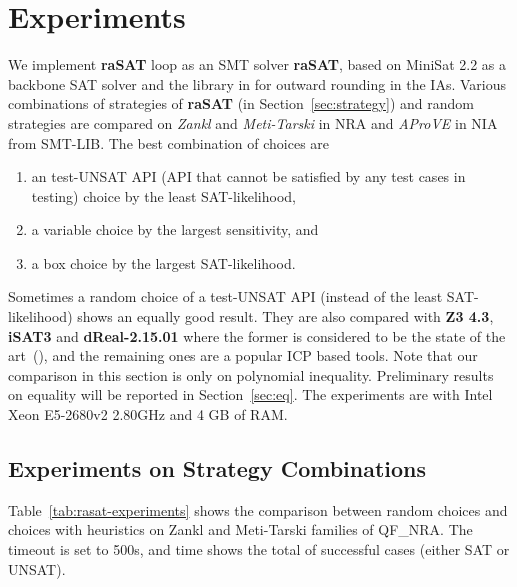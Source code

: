 \documentclass[runningheads,a4paper,oribibl]{llncs}
\begin{document}
\section{Experiments} \label{sec:experiment}

We implement \textbf{raSAT} loop as an SMT solver {\bf raSAT}, 
based on MiniSat 2.2 as a backbone SAT solver and the library in \cite{Al2012.14} for
outward rounding in the IAs. 
Various combinations of strategies of {\bf raSAT} (in Section~\ref{sec:strategy})
and random strategies are compared on {\em Zankl} and {\em Meti-Tarski} in NRA  
and {\em AProVE} in NIA  from SMT-LIB. 
The best combination of choices are 
\begin{enumerate}
\item an test-UNSAT API  (API that cannot be satisfied by any test cases in testing) choice by the least SAT-likelihood, 
\item a variable choice by the largest sensitivity, and 
\item a box choice by the largest SAT-likelihood. 
\end{enumerate} 
Sometimes a random choice of a test-UNSAT API (instead of the least SAT-likelihood) 
shows an equally good result. 
They are also compared with \textbf{Z3 4.3}, \textbf{iSAT3} and \textbf{dReal-2.15.01}
where the former is considered to be the state of the art~(\cite{Jovanovic13}), and 
the remaining ones are a popular ICP based tools. 
Note that our comparison in this section is only on polynomial inequality.
Preliminary results on equality will be reported in Section~\ref{sec:eq}. 
The experiments are with Intel Xeon E5-2680v2 2.80GHz and 4 GB of RAM. 

\subsection{Experiments on Strategy Combinations} \label{sec:expstrategy}


Table~\ref{tab:rasat-experiments} shows the comparison between random choices and choices with heuristics
on Zankl and Meti-Tarski families of QF\_NRA. 
The timeout is set to 500s, and time shows the total of successful cases 
(either SAT or UNSAT). %
\end{document}
